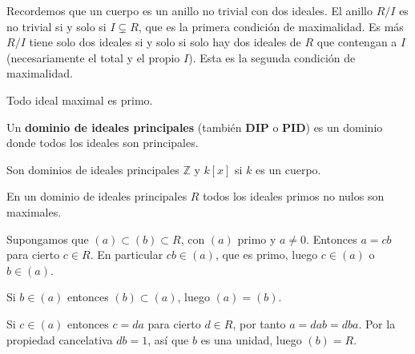 
Recordemos que un cuerpo es un anillo no trivial con dos ideales. El
anillo \(R/I\) es no trivial si y solo si \(I\subsetneq R\), que es la
primera condición de maximalidad. Es más \(R/I\) tiene solo dos ideales
si y solo si solo hay dos ideales de \(R\) que contengan a \(I\)
(necesariamente el total y el propio \(I\)). Esta es la segunda
condición de maximalidad.\\


Todo ideal maximal es primo. 


Un \textbf{dominio de ideales principales} (también \textbf{DIP} o
\textbf{PID}) es un dominio donde todos los ideales son principales.

Son dominios de ideales principales \(\mathbb Z\) y \(k[x]\) si \(k\) es
un cuerpo.


En un dominio de ideales principales \(R\) todos los ideales primos no
nulos son maximales. 


Supongamos que \((a)\subset (b)\subset R\), con \((a)\) primo y
\(a\neq0\). Entonces \(a=cb\) para cierto \(c\in R\). En particular
\(cb\in (a)\), que es primo, luego \(c\in (a)\) o \(b\in (a)\).

Si \(b\in (a)\) entonces \((b)\subset (a)\), luego \((a)=(b)\).

Si \(c\in (a)\) entonces \(c=da\) para cierto \(d\in R\), por tanto
\(a=dab=dba\). Por la propiedad cancelativa \(db=1\), así que \(b\) es
una unidad, luego \((b)=R\). 

